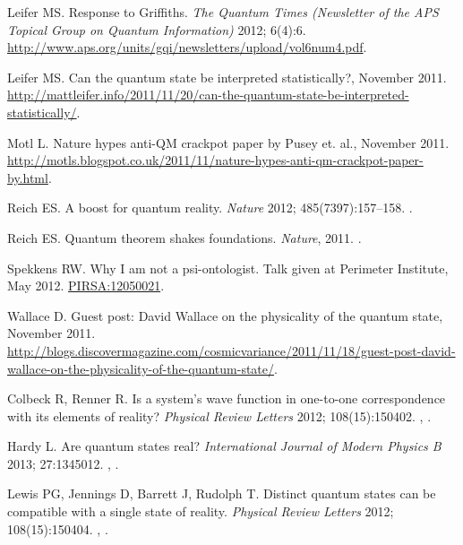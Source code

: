 \documentclass[DIV=calc,paper=a4,fontsize=11pt,twocolumn]{scrartcl} %
\theoremstyle{definition}
\theoremstyle{plain}
\begin{document}
\begin{thebibliography}{10}
Leifer MS.
\newblock Response to Griffiths.
\newblock \emph{The Quantum Times (Newsletter of the APS Topical Group on
Quantum Information)} 2012; 6(4):6.
\newblock \url{http://www.aps.org/units/gqi/newsletters/upload/vol6num4.pdf}.

Leifer MS.
\newblock Can the quantum state be interpreted statistically?, November 2011.
\newblock \url{http://mattleifer.info/2011/11/20/can-the-quantum-state-be-interpreted-statistically/}.

Motl L.
\newblock Nature hypes anti-QM crackpot paper by Pusey et. al., November 2011.
\newblock \url{http://motls.blogspot.co.uk/2011/11/nature-hypes-anti-qm-crackpot-paper-by.html}.

Reich ES.
\newblock A boost for quantum reality.
\newblock \emph{Nature} 2012; 485(7397):157--158.
\newblock \href {http://dx.doi.org/10.1038/485157a}
{}.

Reich ES.
\newblock Quantum theorem shakes foundations.
\newblock \emph{Nature}, 2011.
\newblock \href {http://dx.doi.org/10.1038/nature.2011.9392}
{}.

Spekkens RW.
\newblock Why I am not a psi-ontologist.
\newblock Talk given at Perimeter Institute, May 2012.
\newblock \href{http://pirsa.org/12050021/}{PIRSA:12050021}.

Wallace D.
\newblock Guest post: David Wallace on the physicality of the quantum state, November 2011.
\newblock \url{http://blogs.discovermagazine.com/cosmicvariance/2011/11/18/guest-post-david-wallace-on-the-physicality-of-the-quantum-state/}.

Colbeck R, Renner R.
\newblock Is a system's wave function in one-to-one correspondence with its
elements of reality?
\newblock \emph{Physical Review Letters} 2012; 108(15):150402.
\newblock \href {http://arxiv.org/abs/1111.6597} {},
\href {http://dx.doi.org/10.1103/PhysRevLett.108.150402}
{}.

Hardy L.
\newblock Are quantum states real?
\newblock \emph{International Journal of Modern Physics B} 2013; 27:1345012.
\newblock \href {http://arxiv.org/abs/1205.1439} {},
\href {http://dx.doi.org/10.1142/S0217979213450124}
{}.

Lewis PG, Jennings D, Barrett J, Rudolph T.
\newblock Distinct quantum states can be compatible with a single state of
reality.
\newblock \emph{Physical Review Letters} 2012; 108(15):150404.
\newblock \href {http://arxiv.org/abs/1201.6554} {},
\href {http://dx.doi.org/10.1103/PhysRevLett.109.150404}
{}.


\end{thebibliography}
\end{document}
